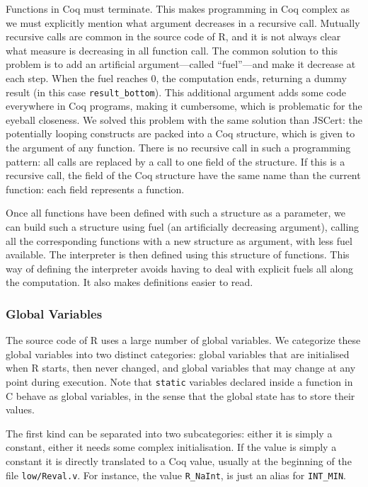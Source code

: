 \documentclass{article}
\newcommand\Coq{Coq}
\newcommand\R{R}
\newcommand\Cn{C}
\begin{document}
Functions in \Coq{} must terminate.
This makes programming in \Coq{} complex as we must explicitly
mention what argument decreases in a recursive call.
Mutually recursive calls are common in the source code of \R{},
and it is not always clear what measure is decreasing in all function call.
The common solution to this problem is to add an artificial
argument—called “fuel”—and make it decrease at each step.
When the fuel reaches \(0\), the computation ends,
returning a dummy result
(in this case \texttt{result_bottom}).
This additional argument adds some code
everywhere in \Coq{} programs,
making it cumbersome,
which is problematic for the eyeball closeness.
We solved this problem with the same solution than JSCert:
the potentially looping constructs are packed into a \Coq{}
structure, which is given to the argument of any function.
There is no recursive call in such a programming pattern:
all calls are replaced by a call to one field
of the structure.
If this is a recursive call,
the field of the \Coq{} structure have the same name than
the current function:
each field represents a function.

Once all functions have been defined
with such a structure as a parameter,
we can build such a structure using fuel
(an artificially decreasing argument),
calling all the corresponding functions
with a new structure as argument,
with less fuel available.
The interpreter is then defined using this structure of functions.
This way of defining the interpreter avoids
having to deal with explicit fuels all along the computation.
It also makes definitions easier to read.


\subsubsection{Global Variables}
\label{sec:global:variables}

The source code of \R{} uses a large number of global variables.
We categorize these global variables into two distinct categories:
global variables that are initialised when \R{} starts, then never changed,
and global variables that may change at any point during execution.
Note that \texttt{static} variables declared inside a function in \Cn{}
behave as global variables,
in the sense that the global state has to store their values.

The first kind can be separated into two subcategories:
either it is simply a constant, either it needs some complex initialisation.
If the value is simply a constant
it is directly translated to a \Coq{} value,
usually at the beginning of the file \texttt{low/Reval.v}.
For instance, the value \texttt{R_NaInt},
is just an alias for \texttt{INT_MIN}.
\end{document}
